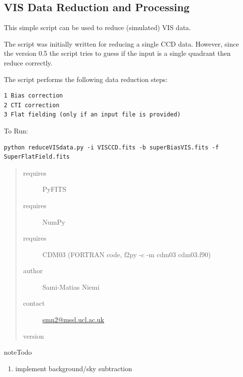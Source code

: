 \documentclass[a4paper,11pt,english]{sphinxmanual}
\begin{document}
\subsection{VIS Data Reduction and Processing}
\label{reduction:vis-data-reduction-and-processing}
This simple script can be used to reduce (simulated) VIS data.

The script was initially written for reducing a single CCD data.
However, since the version 0.5 the script tries to guess if the
input is a single quadrant then reduce correctly.

The script performs the following data reduction steps:

\begin{Verbatim}[commandchars=\\\{\}]
1 Bias correction
2 CTI correction
3 Flat fielding (only if an input file is provided)
\end{Verbatim}

To Run:

\begin{Verbatim}[commandchars=\\\{\}]
python reduceVISdata.py -i VISCCD.fits -b superBiasVIS.fits -f SuperFlatField.fits
\end{Verbatim}
\begin{quote}\begin{description}
\item[{requires}] \leavevmode
PyFITS

\item[{requires}] \leavevmode
NumPy

\item[{requires}] \leavevmode
CDM03 (FORTRAN code, f2py -c -m cdm03 cdm03.f90)

\item[{author}] \leavevmode
Sami-Matias Niemi

\item[{contact}] \leavevmode
\href{mailto:smn2@mssl.ucl.ac.uk}{smn2@mssl.ucl.ac.uk}

\item[{version}] 

\end{description}\end{quote}

\begin{notice}{note}{Todo}
\begin{enumerate}
\item {} 
implement background/sky subtraction

\end{enumerate}
\end{notice}
\end{document}

